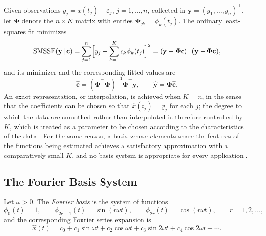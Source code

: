 Given observations $y_j = x(t_j) + \varepsilon_j$, $j = 1,\dots,n$, collected
in $\mathbf{y} = (y_1,\dots,y_n)^\top$, let $\boldsymbol{\Phi}$ denote the
$n\times K$ matrix with entries $\boldsymbol{\Phi}_{jk} = \phi_k(t_j)$. The
ordinary least-squares fit minimizes
\begin{equation}
\mathrm{SMSSE}(\mathbf{y}\,|\,\mathbf{c}) = \sum_{j=1}^{n}\Bigl[y_j -
\sum_{k=1}^{K}c_k\phi_k(t_j)\Bigr]^2 = (\mathbf{y}-\boldsymbol{\Phi}
\mathbf{c})^\top(\mathbf{y}-\boldsymbol{\Phi}\mathbf{c}),
\label{eq:smsse}
\end{equation}
and its minimizer and the corresponding fitted values are
\cite[Sec.~4.2.1]{ramsay2005}
\begin{equation}
\hat{\mathbf{c}} = (\boldsymbol{\Phi}^\top\boldsymbol{\Phi})^{-1}
\boldsymbol{\Phi}^\top\mathbf{y}, \qquad \hat{\mathbf{y}} =
\boldsymbol{\Phi}\hat{\mathbf{c}}.
\label{eq:ols_basis}
\end{equation}
An exact representation, or interpolation, is achieved when $K = n$, in the
sense that the coefficients can be chosen so that $\hat{x}(t_j) = y_j$ for
each $j$; the degree to which the data are smoothed
rather than interpolated is therefore controlled by $K$, which is treated as
a parameter to be chosen according to the characteristics of the data
\cite[Sec.~3.3]{ramsay2005}. For the same reason, a basis whose elements
share the features of the functions being estimated achieves a satisfactory
approximation with a comparatively small $K$, and no basis system is
appropriate for every application \cite[Sec.~3.3]{ramsay2005}.

\subsection{The Fourier Basis System}
\label{subsec:fourier_theory}

\begin{definition}
\label{def:fourier_basis}
Let $\omega>0$. The \emph{Fourier basis} is the system of functions
\begin{equation}
\phi_0(t) = 1,\qquad \phi_{2r-1}(t) = \sin(r\omega t),\qquad
\phi_{2r}(t) = \cos(r\omega t),\qquad r = 1,2,\dots,
\label{eq:fourier_basis}
\end{equation}
and the corresponding Fourier series expansion is
\begin{equation}
\hat{x}(t) = c_0 + c_1\sin\omega t + c_2\cos\omega t + c_3\sin 2\omega t +
c_4\cos 2\omega t + \cdots.
\label{eq:fourier_expansion}
\end{equation}
\end{definition}

